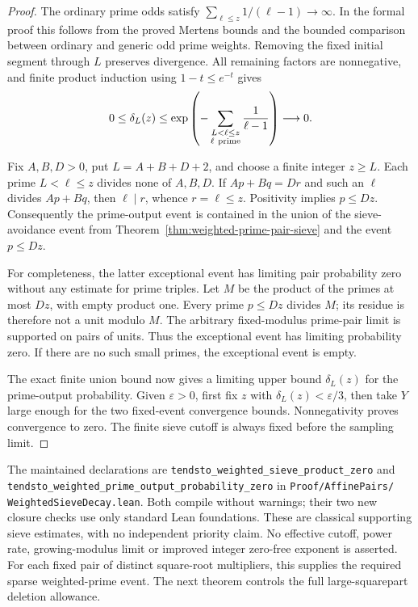\documentclass[11pt]{article}
\begin{document}
\begin{proof}
The ordinary prime odds satisfy
\(\sum_{\ell\le z}1/(\ell-1)\longrightarrow\infty\).
In the formal proof this follows from the proved Mertens bounds
and the bounded comparison between ordinary and generic odd
prime weights. Removing the fixed initial segment through \(L\)
preserves divergence. All remaining factors are nonnegative, and
finite product induction using \(1-t\le e^{-t}\) gives
\[
 0\le\delta_L(z)\le
 \exp\left(-\sum_{\substack{L<\ell\le z\\\ell\ {\rm prime}}}
                  \frac1{\ell-1}\right)\longrightarrow0.
\]

Fix \(A,B,D>0\), put \(L=A+B+D+2\), and choose a finite
integer \(z\ge L\). Each prime \(L<\ell\le z\) divides none
of \(A,B,D\). If \(Ap+Bq=Dr\) and such an \(\ell\) divides
\(Ap+Bq\), then \(\ell\mid r\), whence \(r=\ell\le z\).
Positivity implies \(p\le Dz\). Consequently the prime-output
event is contained in the union of the sieve-avoidance event
from Theorem~\ref{thm:weighted-prime-pair-sieve} and the event
\(p\le Dz\).

For completeness, the latter exceptional event has limiting
pair probability zero without any estimate for prime triples.
Let \(M\) be the product of the primes at most \(Dz\), with
empty product one. Every prime \(p\le Dz\) divides \(M\);
its residue is therefore not a unit modulo \(M\).
The arbitrary fixed-modulus prime-pair limit is supported on
pairs of units. Thus the exceptional event has limiting
probability zero. If there are no such small primes, the
exceptional event is empty.

The exact finite union bound now gives a limiting upper
bound \(\delta_L(z)\) for the prime-output probability.
Given \(\varepsilon>0\), first fix \(z\) with
\(\delta_L(z)<\varepsilon/3\), then take \(Y\) large enough
for the two fixed-event convergence bounds. Nonnegativity
proves convergence to zero. The finite sieve cutoff is always
fixed before the sampling limit.
\end{proof}

The maintained declarations are
\texttt{tendsto\_weighted\_sieve\_product\_zero} and
\texttt{tendsto\_weighted\_prime\_output\_probability\_zero}
in \texttt{Proof/\allowbreak AffinePairs/\allowbreak
WeightedSieveDecay.\allowbreak lean}.
Both compile without warnings; their two new closure checks
use only standard Lean foundations. These are classical
supporting sieve estimates, with no independent priority claim.
No effective cutoff, power rate, growing-modulus limit or
improved integer zero-free exponent is asserted.
For each fixed pair of distinct square-root multipliers, this
supplies the required sparse weighted-prime event. The next theorem
controls the full large-squarepart deletion allowance.
\end{document}
